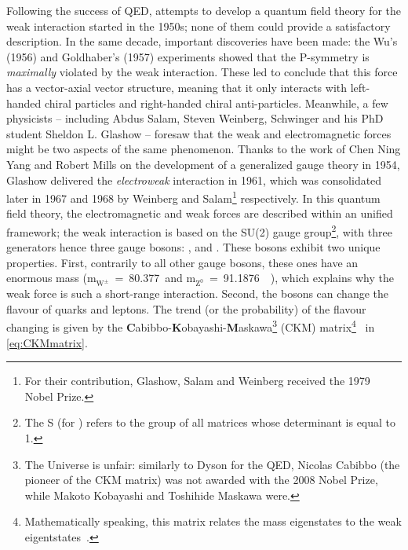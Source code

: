 Following the success of QED, attempts to develop a quantum field theory for the weak interaction started in the 1950s; none of them could provide a satisfactory description. In the same decade, important discoveries have been made: the Wu's (1956) and Goldhaber's (1957) experiments \cite{wuExperimentalTestParity1957, goldhaberHelicityNeutrinos1958} showed that the P-symmetry is \textit{maximally} violated by the weak interaction. These led to conclude that this force has a vector-axial vector structure, meaning that it only interacts with left-handed chiral particles and right-handed chiral anti-particles. Meanwhile, a few physicists -- including Abdus Salam, Steven Weinberg, Schwinger and his PhD student Sheldon L. Glashow -- foresaw that the weak and electromagnetic forces might be two aspects of the same phenomenon. Thanks to the work of Chen Ning Yang and Robert Mills on the development of a generalized gauge theory in 1954, Glashow delivered the \emph{electroweak} interaction in 1961, which was consolidated later in 1967 and 1968 by Weinberg and Salam\footnote{For their contribution, Glashow, Salam and Weinberg received the 1979 Nobel Prize.} respectively. In this quantum field theory, the electromagnetic and weak forces are described within an unified framework; the weak interaction is based on the SU(2) gauge group\footnote{The S (for ) refers to the group of all matrices whose determinant is equal to 1.}, with three generators hence three gauge bosons: \rmWplus, \rmWminus and \rmZzero. These bosons exhibit two unique properties.  First, contrarily to all other gauge bosons, these ones have an enormous mass (m$_{\textrm{W}^{\pm}}$~=~80.377~\gmass and m$_{\textrm{Z}^{0}}$~=~91.1876~\gmass~\cite{particledatagroupReviewParticlePhysics2022}), which explains why the weak force is such a short-range interaction. Second, the \rmWplusminus bosons can change the flavour of quarks and leptons. The trend (or the probability) of the flavour changing is given by the \textbf{C}abibbo-\textbf{K}obayashi-\textbf{M}askawa\footnote{The Universe is unfair: similarly to Dyson for the QED, Nicolas Cabibbo (the pioneer of the CKM matrix) was not awarded with the 2008 Nobel Prize, while Makoto Kobayashi and Toshihide Maskawa were.} (CKM) matrix\footnote{Mathematically speaking, this matrix relates the mass eigenstates to the weak eigentstates~\cite{thomsonModernParticlePhysics2013}.}~\cite{particledatagroupReviewParticlePhysics2022} in \eq\ref{eq:CKMmatrix}.


